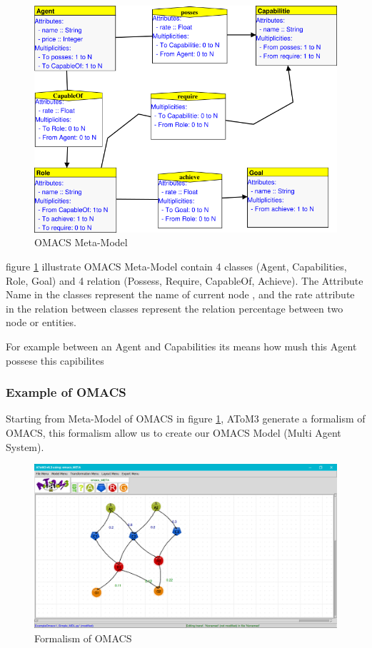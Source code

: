 \begin{figure}[th]
	\centering
 	\includegraphics[scale=0.7]{ch3/img/omacs_meta}
	\caption{\label{fig:OMACS Meta-Model}OMACS Meta-Model}
\end{figure} 
\vspace{0.9cm}
figure \ref{fig:OMACS Meta-Model} illustrate OMACS Meta-Model  contain 4 classes (Agent, Capabilities, Role, Goal) 
and 4 relation (Possess, Require, CapableOf, Achieve). 
The Attribute Name in the classes represent the name of current node ,
and the rate attribute in the relation between classes represent  the relation percentage between two node or entities.

For example between an Agent and Capabilities its means how mush this Agent possese this capibilites
\pagebreak
\subsubsection{Example of OMACS}

Starting from  Meta-Model of OMACS in figure  \ref{fig:OMACS Meta-Model}, AToM3 generate a formalism of OMACS, this formalism allow us to create our OMACS Model (Multi Agent System).
\vspace{0.1cm}
\begin{figure}[th]
	\centering
 	\includegraphics[scale=0.3]{ch3/img/omacs_model}
	\caption{\label{fig:OMACS Model}Formalism of OMACS}
\end{figure} 

